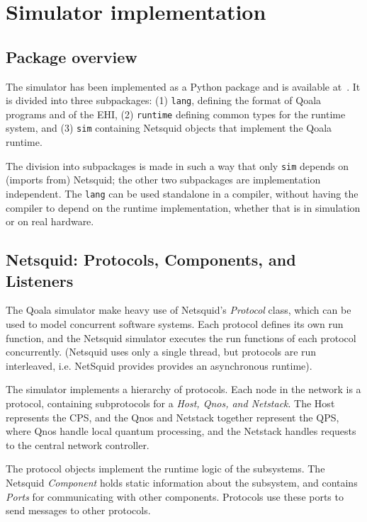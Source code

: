 \section{Simulator implementation}
\label{qoala:sec:app:simulator}

\subsection{Package overview}
The simulator has been implemented as a Python package and is available at~\cite{qoala2023simulator}.
It is divided into three subpackages: (1) \texttt{lang}, defining the format of Qoala programs and of the EHI, (2) \texttt{runtime} defining common types for the runtime system, and (3) \texttt{sim} containing Netsquid objects that implement the Qoala runtime.

The division into subpackages is made in such a way that only \texttt{sim} depends on (imports from) Netsquid; the other two subpackages are implementation independent.
The \texttt{lang} can be used standalone in a compiler, without having the compiler to depend on the runtime implementation, whether that is in simulation or on real hardware.


\subsection{Netsquid: Protocols, Components, and Listeners}
The Qoala simulator make heavy use of Netsquid's \textit{Protocol} class,
which can be used to model concurrent software systems. 
Each protocol defines its own run function, and the Netsquid simulator
executes the run functions of each protocol concurrently.
(Netsquid uses only a single thread, but protocols are run interleaved, i.e. NetSquid provides provides an asynchronous runtime).

The simulator implements a hierarchy of protocols. 
Each node in the network is a protocol, containing subprotocols for a \textit{Host, Qnos, and Netstack}. The Host represents the CPS, and the Qnos and Netstack together represent the QPS, where Qnos handle local quantum processing, and the Netstack handles requests to the central network controller. 

The protocol objects implement the runtime logic of the subsystems.
The Netsquid \textit{Component} holds static information about the subsystem, and contains \textit{Ports} for communicating with other components. Protocols use these ports to send messages to other protocols. 

